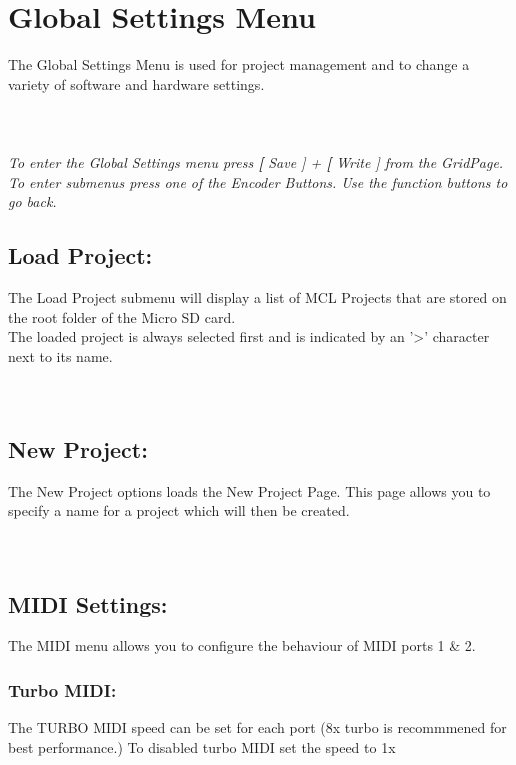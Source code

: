 \chapter{Global Settings Menu}
The Global Settings Menu is used for project management and to change a variety of software and hardware settings.\\\\
\\\\
\textit{To enter the Global Settings menu press \textbf[ Save ] + \textbf[ Write ] from the GridPage.\\
To enter submenus press one of the Encoder Buttons. Use the function buttons to go back.}
\section{Load Project:}
The Load Project submenu will display a list of MCL Projects that are stored on the root folder of the Micro SD card. \\
The loaded project is always selected first and is indicated by an '>' character next to its name.\\\\
\\
\section{New Project:}
The New Project options loads the New Project Page. This page allows you to specify a name for a project which will then be created.\\\\
\\
\section{MIDI Settings:}
The MIDI menu allows you to configure the behaviour of MIDI ports 1 & 2.\\

\subsection{Turbo MIDI:}
The TURBO MIDI speed can be set for each port (8x turbo is recommmened for best performance.) To disabled turbo MIDI set the speed to 1x

